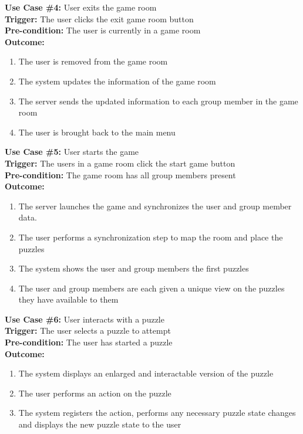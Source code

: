 \documentclass[12pt]{article}
\begin{document}
\textbf{Use Case \#4:} User exits the game room\\
\textbf{Trigger:} The user clicks the exit game room button\\
\textbf{Pre-condition:} The user is currently in a game room\\
\textbf{Outcome:}
\begin{enumerate}
	\item The user is removed from the game room
    \item The system updates the information of the game room
    \item The server sends the updated information to each group member in the game room
    \item The user is brought back to the main menu
\end{enumerate}
\textbf{Use Case \#5:} User starts the game\\
\textbf{Trigger:} The users in a game room click the start game button\\
\textbf{Pre-condition:} The game room has all group members present\\
\textbf{Outcome:}
\begin{enumerate}
	\item The server launches the game and synchronizes the user and group member data. 
    \item The user performs a synchronization step to map the room and place the puzzles
    \item The system shows the user and group members the first puzzles
    \item The user and group members are each given a unique view on the puzzles they have available to them
\end{enumerate}
\textbf{Use Case \#6:} User interacts with a puzzle\\
\textbf{Trigger:} The user selects a puzzle to attempt\\
\textbf{Pre-condition:} The user has started a puzzle\\
\textbf{Outcome:}
\begin{enumerate} %
	\item The system displays an enlarged and interactable version of the puzzle
	\item The user performs an action on the puzzle
	\item The system registers the action, performs any necessary puzzle state changes and displays the new puzzle state to the user    
\end{enumerate}
\end{document}
